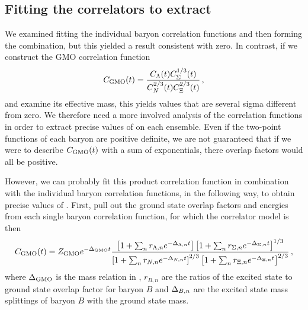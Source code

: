 \documentclass[prd,tightenlines,preprintnumbers,showpacs,superscriptaddress,notitlepage,nofootinbib,eqsecnum,floatfix,notitlepage]{revtex4-1}
\begin{document}
\subsection{Fitting the correlators to extract \gmo}
We examined fitting the individual baryon correlation functions and then forming the \gmo combination, but this yielded a result consistent with zero.
In contrast, if we construct the GMO correlation function
\begin{equation}\label{eq:C_GMO}
C_{\rm GMO}(t) = \frac{C_{\Lambda}(t) C_{\Sigma}^{1/3}(t)}{C_N^{2/3}(t) C_\Xi^{2/3}(t)}\, ,
\end{equation}
and examine its effective mass, this yields values that are several sigma different from zero.
We therefore need a more involved analysis of the correlation functions in order to extract precise values of \gmo on each ensemble.
Even if the two-point functions of each baryon are positive definite, we are not guaranteed that if we were to describe $C_{\rm GMO}(t)$ with a sum of exponentials, there overlap factors would all be positive.

However, we can probably fit this product correlation function in combination with the individual baryon correlation functions, in the following way, to obtain precise values of \gmo.
First, pull out the ground state overlap factors and energies from each single baryon correlation function, for which the correlator model is then
\begin{equation}
C_{\rm GMO}(t) =
    Z_{\rm GMO} e^{-{\Delta}_{\rm GMO} t}
    \frac{
        \left[1 + \sum_n r_{{\Lambda},n}e^{-{\Delta}_{{\Lambda},n}t}\right]
        \left[ 1 + \sum_n r_{{\Sigma},n}e^{-{\Delta}_{{\Sigma},n}t}\right]^{1/3}
        }{
        \left[1 + \sum_n r_{N,n}e^{-{\Delta}_{N,n}t}\right]^{2/3}
        \left[ 1 + \sum_n r_{\Xi,n}e^{-{\Delta}_{\Xi,n}t}\right]^{2/3}
        }\, ,
\end{equation}
where ${\Delta}_{\rm GMO}$ is the mass relation in , $r_{B,n}$ are the ratios of the excited state to ground state overlap factor for baryon $B$ and ${\Delta}_{B,n}$ are the excited state mass splittings of baryon $B$ with the ground state mass.
\end{document}
